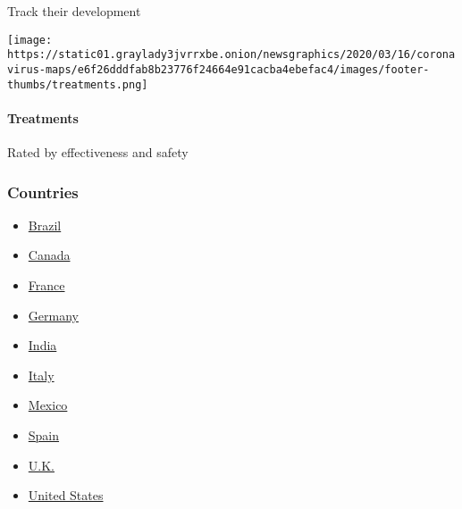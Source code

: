 Track their development

\href{https://www.nytimes3xbfgragh.onion/interactive/2020/science/coronavirus-drugs-treatments.html}{}

\texttt{[image: https://static01.graylady3jvrrxbe.onion/newsgraphics/2020/03/16/coronavirus-maps/e6f26dddfab8b23776f24664e91cacba4ebefac4/images/footer-thumbs/treatments.png]}

\hypertarget{treatments}{%
\paragraph{Treatments}\label{treatments}}

Rated by effectiveness and safety

\hypertarget{countries}{%
\subsubsection{Countries}\label{countries}}

\begin{itemize}
\tightlist
\item
  \href{https://www.nytimes3xbfgragh.onion/interactive/2020/world/americas/brazil-coronavirus-cases.html}{Brazil}
\item
  \href{https://www.nytimes3xbfgragh.onion/interactive/2020/world/canada/canada-coronavirus-cases.html}{Canada}
\item
  \href{https://www.nytimes3xbfgragh.onion/interactive/2020/world/europe/france-coronavirus-cases.html}{France}
\item
  \href{https://www.nytimes3xbfgragh.onion/interactive/2020/world/europe/germany-coronavirus-cases.html}{Germany}
\item
  \href{https://www.nytimes3xbfgragh.onion/interactive/2020/world/asia/india-coronavirus-cases.html}{India}
\item
  \href{https://www.nytimes3xbfgragh.onion/interactive/2020/world/europe/italy-coronavirus-cases.html}{Italy}
\item
  \href{https://www.nytimes3xbfgragh.onion/interactive/2020/world/americas/mexico-coronavirus-cases.html}{Mexico}
\item
  \href{https://www.nytimes3xbfgragh.onion/interactive/2020/world/europe/spain-coronavirus-cases.html}{Spain}
\item
  \href{https://www.nytimes3xbfgragh.onion/interactive/2020/world/europe/united-kingdom-coronavirus-cases.html}{U.K.}
\item
  \href{https://www.nytimes3xbfgragh.onion/interactive/2020/us/coronavirus-us-cases.html}{United
  States}
\end{itemize}

